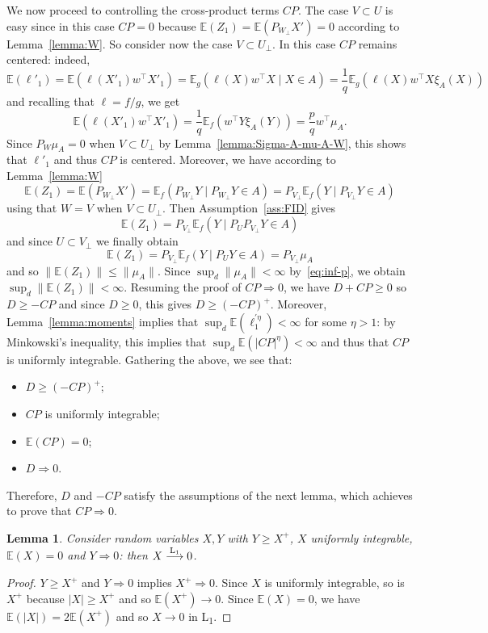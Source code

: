 \documentclass[]{article}
\newcommand{\E}{\mathbb{E}}
\newcommand{\Lone}{\stackrel{\text{\textnormal{L\textsubscript{1}}}}{\longrightarrow}}
\theoremstyle{plain}
\newtheorem{lemma}{Lemma}[section]
\theoremstyle{definition}
\begin{document}
We now proceed to controlling the cross-product terms $CP$. The case $V \subset U$ is easy since in this case $CP = 0$ because $\E(Z_1) = \E(P_{W_\perp} X') = 0$ according to Lemma~\ref{lemma:W}. So consider now the case $V \subset U_\perp$. In this case $CP$ remains centered: indeed,
\[ \E(\ell'_1) = \E(\ell(X'_1) w^\top X'_1) = \E_g( \ell(X) w^\top X \mid X \in A) = \frac{1}{q} \E_g( \ell(X) w^\top X \xi_A(X)) \]
and recalling that $\ell = f/g$, we get
\[ \E(\ell(X'_1) w^\top X'_1) = \frac{1}{q} \E_f( w^\top Y \xi_A(Y)) = \frac{p}{q} w^\top \mu_A. \]
Since $P_W \mu_A = 0$ when $V \subset U_\perp$ by Lemma~\ref{lemma:Sigma-A-mu-A-W}, this shows that $\ell'_1$ and thus $CP$ is centered. Moreover, we have according to Lemma~\ref{lemma:W}
\[ \E(Z_1) = \E(P_{W_\perp} X') = \E_f(P_{W_\perp} Y \mid P_{W_\perp} Y \in A) = P_{V_\perp} \E_f(Y \mid P_{V_\perp} Y \in A) \]
using that $W = V$ when $V \subset U_\perp$. Then Assumption~\ref{ass:FID} gives
\[ \E(Z_1) = P_{V_\perp} \E_f(Y \mid P_U P_{V_\perp} Y \in A) \]
and since $U \subset V_\perp$ we finally obtain
\[ \E(Z_1) = P_{V_\perp} \E_f(Y \mid P_U Y \in A) = P_{V_\perp} \mu_A \]
and so $\lVert \E(Z_1) \rVert \leq \lVert \mu_A \rVert$. Since $\sup_d \lVert \mu_A \rVert < \infty$ by~\eqref{eq:inf-p}, we obtain $\sup_d \lVert \E(Z_1) \rVert < \infty$. Resuming the proof of $CP \Rightarrow 0$, we have $D + CP \geq 0$ so $D \geq -CP$ and since $D \geq 0$, this gives $D \geq (-CP)^+$. Moreover, Lemma~\ref{lemma:moments} implies that $\sup_d \E(\ell^{\prime \eta}_1) < \infty$ for some $\eta > 1$: by Minkowski's inequality, this implies that $\sup_d \E(\lvert CP \rvert^\eta) < \infty$ and thus that $CP$ is uniformly integrable. Gathering the above, we see that:
\begin{itemize}
	\item $D \geq (-CP)^+$;
	\item $CP$ is uniformly integrable;
	\item $\E(CP) = 0$;
	\item $D \Rightarrow 0$.
\end{itemize}
Therefore, $D$ and $-CP$ satisfy the assumptions of the next lemma, which achieves to prove that $CP \Rightarrow 0$.

\begin{lemma}
	Consider random variables $X,Y$ with $Y \geq X^+$, $X$ uniformly integrable, $\E(X) = 0$ and $Y \Rightarrow 0$: then $X \Lone 0$.
\end{lemma}

\begin{proof}
	$Y \geq X^+$ and $Y \Rightarrow 0$ implies $X^+ \Rightarrow 0$. Since $X$ is uniformly integrable, so is $X^+$ because $\lvert X \rvert \geq X^+$ and so $\E(X^+) \to 0$. Since $\E(X) = 0$, we have $\E(\lvert X \rvert) = 2\E(X^+)$ and so $X \to 0$ in L\textsubscript1.
\end{proof}
\end{document}
